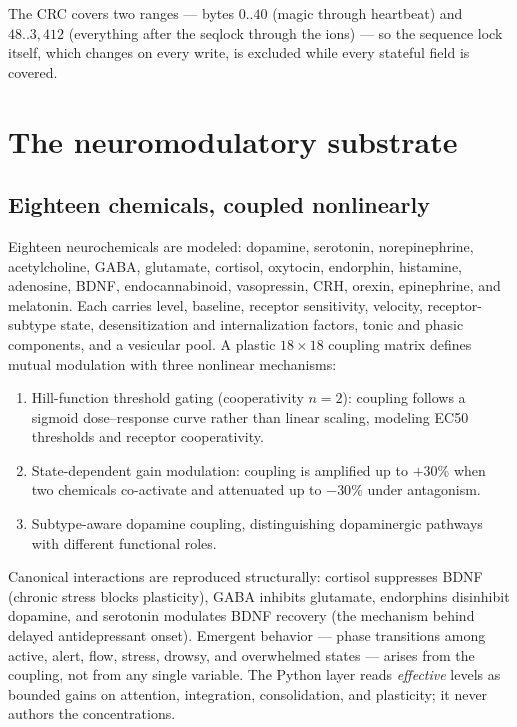 \documentclass[11pt]{article}
\begin{document}
The CRC covers two ranges --- bytes $0..40$ (magic through heartbeat)
and $48..3{,}412$ (everything after the seqlock through the ions) ---
so the sequence lock itself, which changes on every write, is excluded
while every stateful field is covered.

\section{The neuromodulatory substrate}

\subsection{Eighteen chemicals, coupled nonlinearly}

Eighteen neurochemicals are modeled: dopamine, serotonin,
norepinephrine, acetylcholine, GABA, glutamate, cortisol, oxytocin,
endorphin, histamine, adenosine, BDNF, endocannabinoid, vasopressin,
CRH, orexin, epinephrine, and melatonin. Each carries level, baseline,
receptor sensitivity, velocity, receptor-subtype state, desensitization
and internalization factors, tonic and phasic components, and a
vesicular pool. A plastic $18\times18$ coupling matrix defines mutual
modulation with three nonlinear mechanisms:

\begin{enumerate}
  \item Hill-function threshold gating (cooperativity $n{=}2$):
    coupling follows a sigmoid dose--response curve rather than linear
    scaling, modeling EC50 thresholds and receptor cooperativity.
  \item State-dependent gain modulation: coupling is amplified up to
    $+30\%$ when two chemicals co-activate and attenuated up to $-30\%$
    under antagonism.
  \item Subtype-aware dopamine coupling, distinguishing dopaminergic
    pathways with different functional roles.
\end{enumerate}

Canonical interactions are reproduced structurally: cortisol suppresses
BDNF (chronic stress blocks plasticity), GABA inhibits glutamate,
endorphins disinhibit dopamine, and serotonin modulates BDNF recovery
(the mechanism behind delayed antidepressant onset). Emergent behavior
--- phase transitions among active, alert, flow, stress, drowsy, and
overwhelmed states --- arises from the coupling, not from any single
variable. The Python layer reads \emph{effective} levels as bounded
gains on attention, integration, consolidation, and plasticity; it
never authors the concentrations.
\end{document}

